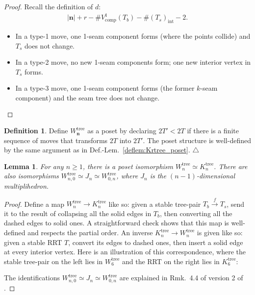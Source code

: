 \documentclass[11pt]{amsart}
\newtheorem{lemma}[theorem]{Lemma}
\theoremstyle{definition}
\newtheorem{definition}[theorem]{Definition}
\theoremstyle{remark}
\theoremstyle{plain}
\newcommand\bn{\mathbf{n}}
\newcommand{\on}{\operatorname}
\newcommand{\comp}{C^2}
\renewcommand{\comp}{{\on{comp}}}
\newcommand{\inte}{{\on{int}}}
\newcommand{\tree}{{\on{tree}}}
\newcommand{\sr}{\stackrel}
\begin{document}
\begin{proof}
Recall the definition of $d$:
\begin{align}
|\bn| + r - \#\!V_\comp^1(T_b) - \#\!(T_s)_\inte - 2.
\end{align}
\begin{itemize}
\item In a type-1 move, one 1-seam component forms (where the points collide) and $T_s$ does not change.

\item In a type-2 move, no new 1-seam components form; one new interior vertex in $T_s$ forms.

\item In a type-3 move, one 1-seam component forms (the former $k$-seam component) and the seam tree does not change.
\end{itemize}
\end{proof}

\begin{definition}
\label{def:Wn_tree}
Define $W_\bn^\tree$ as a poset by declaring $2T' < 2T$ if there is a finite sequence of moves that transforms $2T$ into $2T'$.
The poset structure is well-defined by the same argument as in Def.-Lem.~\ref{deflem:Krtree_poset}.
\null\hfill$\triangle$
\end{definition}

\begin{lemma}
\label{lem:WnKn}
For any $n \geq 1$, there is a poset isomorphism $W_n^\tree \simeq K_n^\tree$.
There are also isomorphisms $W_{n,0}^\tree \simeq J_n \simeq W_{0,n}^\tree$, where $J_n$ is the $(n-1)$-dimensional multiplihedron.
\end{lemma}

\begin{proof}
Define a map $W_n^\tree \to K_n^\tree$ like so: given a stable tree-pair $T_b \sr{f}{\to} T_s$, send it to the result of collapsing all the solid edges in $T_b$, then converting all the dashed edges to solid ones.
A straightforward check shows that this map is well-defined and respects the partial order.
An inverse $K_n^\tree \to W_n^\tree$ is given like so: given a stable RRT $T$, convert its edges to dashed ones, then insert a solid edge at every interior vertex.
Here is an illustration of this correspondence, where the stable tree-pair on the left lies in $W_6^\tree$ and the RRT on the right lies in $K_6^\tree$:
%
\begin{figure}[H]
\centering
\def\svgwidth{0.4\columnwidth}

\end{figure}
%

The identifications $W_{n,0}^\tree \simeq J_n \simeq W_{0,n}^\tree$ are explained in Rmk.~4.4 of version 2 of \cite{bw:compactness}.
\end{proof}
\end{document}
